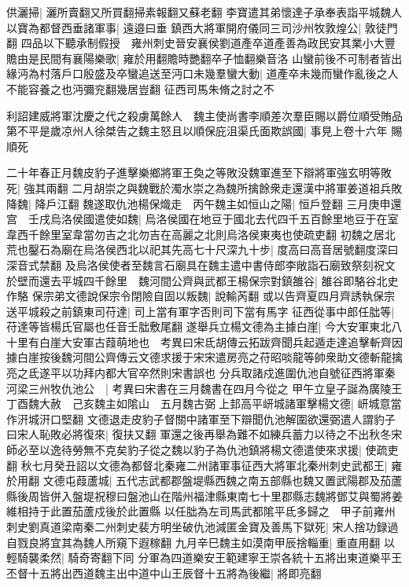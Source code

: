 供灑掃|{
	灑所賣翻又所買翻掃素報翻又蘇老翻}
李寶遣其弟懷達子承奉表詣平城魏人以寶為都督西垂諸軍事|{
	遠邉曰垂}
鎮西大將軍開府儀同三司沙州牧敦煌公|{
	敦徒門翻}
四品以下聽承制假授　雍州刺史晉安襄侯劉道產卒道產善為政民安其業小大豐贍由是民間有襄陽樂歌|{
	雍於用翻贍時艷翻卒子恤翻樂音洛}
山蠻前後不可制者皆出緣沔為村落戶口殷盛及卒蠻追送至沔口未幾羣蠻大動|{
	道產卒未幾而蠻作亂後之人不能容養之也沔彌兖翻幾居豈翻}
征西司馬朱脩之討之不

利詔建威將軍沈慶之代之殺虜萬餘人　魏主使尚書李順差次羣臣賜以爵位順受賄品第不平是歲凉州人徐桀告之魏主怒且以順保庇沮渠氏面欺誤國|{
	事見上卷十六年}
賜順死

二十年春正月魏皮豹子進擊樂鄉將軍王奐之等敗没魏軍進至下辯將軍強玄明等敗死|{
	強其兩翻}
二月胡崇之與魏戰於濁水崇之為魏所擒餘衆走還漢中將軍姜道祖兵敗降魏|{
	降戶江翻}
魏遂取仇池楊保熾走　丙午魏主如恒山之陽|{
	恒戶登翻}
三月庚申還宫　壬戌烏洛侯國遣使如魏|{
	烏洛侯國在地豆于國北去代四千五百餘里地豆于在室韋西千餘里室韋當勿吉之北勿吉在高麗之北則烏洛侯東夷也使疏吏翻}
初魏之居北荒也鑿石為廟在烏洛侯西北以祀其先高七十尺深九十步|{
	度高曰高音居號翻度深曰深音式禁翻}
及烏洛侯使者至魏言石廟具在魏主遣中書侍郎李敞詣石廟致祭刻祝文於壁而還去平城四千餘里　魏河間公齊與武都王楊保宗對鎮雒谷|{
	雒谷即駱谷北史作駱}
保宗弟文德說保宗令閉險自固以叛魏|{
	說輸芮翻}
或以告齊夏四月齊誘執保宗送平城殺之前鎮東司苻達|{
	司上當有軍字否則司下當有馬字}
征西從事中郎任朏等|{
	苻達等皆楊氏官屬也任音壬朏敷尾翻}
遂舉兵立楊文德為主據白崖|{
	今大安軍東北八十里有白崖大安軍古葭萌地也　考異曰宋氐胡傳云拓跋齊聞兵起遁走達追擊斬齊因據白崖按後魏河間公齊傳云文德求援于宋宋遣房亮之苻昭啖龍等帥衆助文德斬龍擒亮之氐遂平以功拜内都大官卒然則宋書誤也}
分兵取諸戍進圍仇池自號征西將軍秦河梁三州牧仇池公　|{
	考異曰宋書在三月魏書在四月今從之}
甲午立皇子誕為廣陵王　丁酉魏大赦　己亥魏主如隂山　五月魏古弼上邽高平岍城諸軍擊楊文德|{
	岍城意當作汧城汧口堅翻}
文德退走皮豹子督關中諸軍至下辯聞仇池解圍欲還弼遣人謂豹子曰宋人恥敗必將復來|{
	復扶又翻}
軍還之後再舉為難不如練兵蓄力以待之不出秋冬宋師必至以逸待勞無不克矣豹子從之魏以豹子為仇池鎮將楊文德遣使來求援|{
	使疏吏翻}
秋七月癸丑詔以文德為都督北秦雍二州諸軍事征西大將軍北秦州刺史武都王|{
	雍於用翻}
文德屯葭蘆城|{
	五代志武都郡盤堤縣西魏之南五部縣也魏又置武陽郡及茄蘆縣後周皆併入盤堤祝穆曰盤池山在階州福津縣東南七十里郡縣志魏將鄧艾與蜀將姜維相持于此置茄蘆戍後於此置縣}
以任朏為左司馬武都隂平氐多歸之　甲子前雍州刺史劉真道梁南秦二州刺史裴方明坐破仇池減匿金寶及善馬下獄死|{
	宋人捨功録過自戮良將宜其為魏人所窺下遐稼翻}
九月辛巳魏主如漠南甲辰捨輜重|{
	重直用翻}
以輕騎襲柔然|{
	騎奇寄翻下同}
分軍為四道樂安王範建寧王崇各統十五將出東道樂平王丕督十五將出西道魏主出中道中山王辰督十五將為後繼|{
	將即亮翻}
